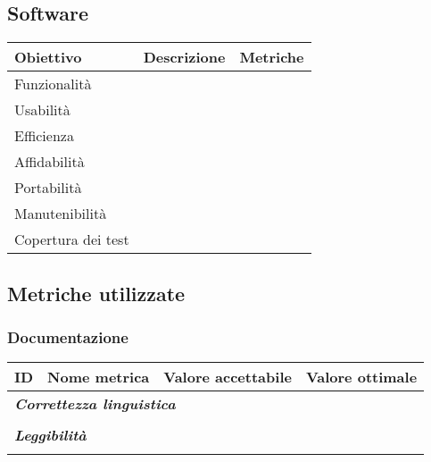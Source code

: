 \documentclass[10pt, a4paper]{article}
\begin{document}
\subsection{Software}
    {\renewcommand{\arraystretch}{1.5}
    \begin{tabularx}{\textwidth}{p{}|p{}|X}
    \textbf{Obiettivo} & \textbf{Descrizione} & \textbf{Metriche}  \\
    \hline
    Funzionalità &  & \\
    \hline
    Usabilità &  & \\
    \hline
    Efficienza &  &  \\
    \hline
    Affidabilità &  &  \\
    \hline
    Portabilità &  &  \\
    \hline
    Manutenibilità &  &  \\
    \hline
    Copertura dei test &  &  \\
    \end{tabularx}}

\subsection{Metriche utilizzate}
\subsubsection{Documentazione}
    {\renewcommand{\arraystretch}{1.5}
    \begin{tabularx}{\textwidth}{p{}|p{}|X|X}
    \textbf{ID} & \textbf{Nome metrica} & \textbf{Valore accettabile} & \textbf{Valore ottimale}  \\
    \hline
    \multicolumn{4}{l}{\cellcolor{primarycolor}\textbf{\textit{Correttezza linguistica}}} \\
    \hline
     &  &  &  \\
    \hline
    \multicolumn{4}{l}{\cellcolor{primarycolor}\textbf{\textit{Leggibilità}}} \\
    \hline
     &  &  &  \\
    \end{tabularx}}
    
\end{document}
